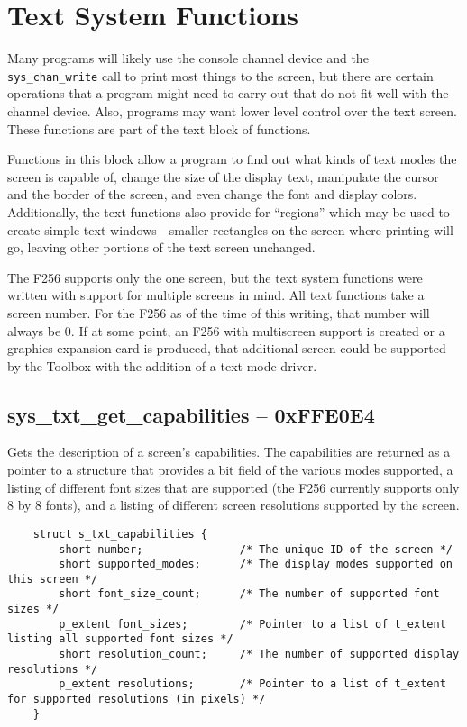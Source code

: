 \section{Text System Functions}
Many programs will likely use the console channel device and the \verb+sys_chan_write+ call to print most things to the screen,
but there are certain operations that a program might need to carry out that do not fit well with the channel device. Also,
programs may want lower level control over the text screen. These functions are part of the text block of functions.

Functions in this block allow a program to find out what kinds of text modes the screen is capable of, change the
size of the display text, manipulate the cursor and the border of the screen, and even change the font and display colors.
Additionally, the text functions also provide for ``regions'' which may be used to create simple text windows---smaller rectangles
on the screen where printing will go, leaving other portions of the text screen unchanged.

The F256 supports only the one screen, but the text system functions were written with support for multiple screens in mind.
All text functions take a screen number. For the F256 as of the time of this writing, that number will always be 0.
If at some point, an F256 with multiscreen support is created or a graphics expansion card is produced, that additional
screen could be supported by the Toolbox with the addition of a text mode driver.

\subsection*{sys\_txt\_get\_capabilities  -- 0xFFE0E4}
Gets the description of a screen's capabilities.
The capabilities are returned as a pointer to a structure that provides a bit field of the various modes supported,
a listing of different font sizes that are supported (the F256 currently supports only 8 by 8 fonts),
and a listing of different screen resolutions supported by the screen.

\begin{lstlisting}
    struct s_txt_capabilities {
        short number;               /* The unique ID of the screen */
        short supported_modes;      /* The display modes supported on this screen */
        short font_size_count;      /* The number of supported font sizes */
        p_extent font_sizes;        /* Pointer to a list of t_extent listing all supported font sizes */
        short resolution_count;     /* The number of supported display resolutions */
        p_extent resolutions;       /* Pointer to a list of t_extent for supported resolutions (in pixels) */
    }
\end{lstlisting}

